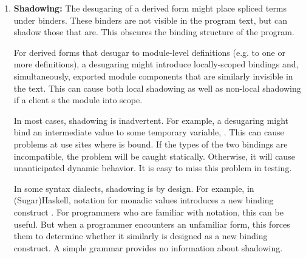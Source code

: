 {\begin{enumerate}
For example, consider a production in a grammar that looks like this: 
\begin{lstlisting}[numbers=none]
start <- "%(" verseml_exp ")"
\end{lstlisting}

The name of the non-terminal  suggests that it will match any VerseML expression, but it is not certain that this is the case. Moreover, even if we know that this non-terminal matches VerseML expressions, it is not certain that the output logic will insert that expression as-is into the desugaring -- it may instead only examine its form, or transform it in some way (in which case highlighting it as a spliced expression might be misleading.)

Systems that support the generation of editor plug-ins, such as Spoofax \cite{kats2010spoofax} and Sugarclipse for SugarJ \cite{Erdweg:2012:GLE}, can generate syntax coloring logic from an annotated grammar definition, which often give programmers some indication of where a spliced term occurs. However, there is no definitive information about segmentation in how the editor displays the derived form. (Moreover, these editor plug-ins can themselves conflict, even if the syntax itself is deterministic.)
\item \textbf{Shadowing:} The desugaring of a derived form might place spliced terms under binders. These binders are not visible in the program text, but can shadow those that are. This obscures the binding structure of the program.

For derived forms that desugar to module-level definitions (e.g. to one or more  definitions), a desugaring might introduce locally-scoped bindings and, simultaneously, exported module components that are similarly invisible in the text. This can cause both local shadowing as well as non-local shadowing if a client s the module into scope.

In most cases, shadowing is inadvertent. For example, a desugaring might bind an intermediate value to some temporary variable, . This can cause problems at use sites where  is bound. If the types of the two bindings are incompatible, the problem will be caught statically. Otherwise, it will cause unanticipated dynamic behavior. It is easy to miss this problem in testing.

In some syntax dialects, shadowing is by design. For example, in (Sugar)Haskell,  notation for monadic values introduces a new binding construct \cite{erdweg2012layout}. For programmers who {are} familiar with  notation, this can be useful. But when a programmer encounters an unfamiliar form, this forces them to determine whether it similarly is designed as a new binding construct. A simple grammar provides no information about shadowing.%


\end{enumerate}}
